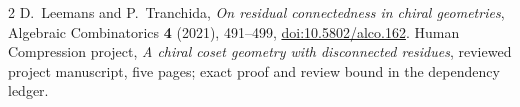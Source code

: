 \documentclass[11pt]{article}
\begin{document}
\begin{thebibliography}{2}
 D.~Leemans and P.~Tranchida,
\emph{On residual connectedness in chiral geometries},
Algebraic Combinatorics \textbf{4} (2021), 491--499,
\href{https://doi.org/10.5802/alco.162}{doi:10.5802/alco.162}.
 Human Compression project,
\emph{A chiral coset geometry with disconnected residues},
reviewed project manuscript, five pages; exact proof and review bound
in the dependency ledger.
\end{thebibliography}
\end{document}
